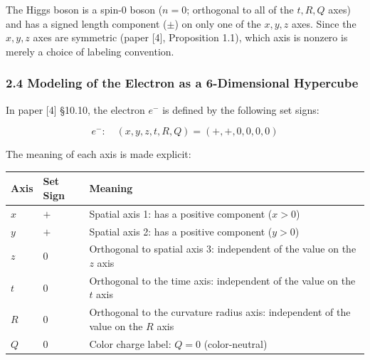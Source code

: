 \documentclass[
  a4paper,11pt]{article}
\newcounter{none}
\theoremstyle{definition}
\theoremstyle{remark}
\begin{document}
The Higgs boson is a spin-0 boson (\(n = 0\); orthogonal to all of the
\(t, R, Q\) axes) and has a signed length component (\(\pm\)) on only
one of the \(x, y, z\) axes. Since the \(x, y, z\) axes are symmetric
(paper {[}4{]}, Proposition 1.1), which axis is nonzero is merely a
choice of labeling convention.

\subsubsection{2.4 Modeling of the Electron as a 6-Dimensional
Hypercube}\label{modeling-of-the-electron-as-a-6-dimensional-hypercube}

In paper {[}4{]} §10.10, the electron \(e^-\) is defined by the
following set signs:

\[e^-: \quad (x, y, z, t, R, Q) = (+, +, 0, 0, 0, 0)\]

The meaning of each axis is made explicit:

{\def\LTcaptype{none} %
\begin{longtable}[]{@{}
  >{\centering\arraybackslash}p{}
  >{\centering\arraybackslash}p{}
  >{\raggedright\arraybackslash}p{}@{}}
\toprule\noalign{}
\begin{minipage}[b]{\linewidth}\centering
Axis
\end{minipage} & \begin{minipage}[b]{\linewidth}\centering
Set Sign
\end{minipage} & \begin{minipage}[b]{\linewidth}\raggedright
Meaning
\end{minipage} \\
\midrule\noalign{}
\endhead
\bottomrule\noalign{}
\endlastfoot
\(x\) & \(+\) & Spatial axis 1: has a positive component (\(x > 0\)) \\
\(y\) & \(+\) & Spatial axis 2: has a positive component (\(y > 0\)) \\
\(z\) & \(0\) & Orthogonal to spatial axis 3: independent of the value
on the \(z\) axis \\
\(t\) & \(0\) & Orthogonal to the time axis: independent of the value on
the \(t\) axis \\
\(R\) & \(0\) & Orthogonal to the curvature radius axis: independent of
the value on the \(R\) axis \\
\(Q\) & \(0\) & Color charge label: \(Q = 0\) (color-neutral) \\
\end{longtable}
}
\end{document}
